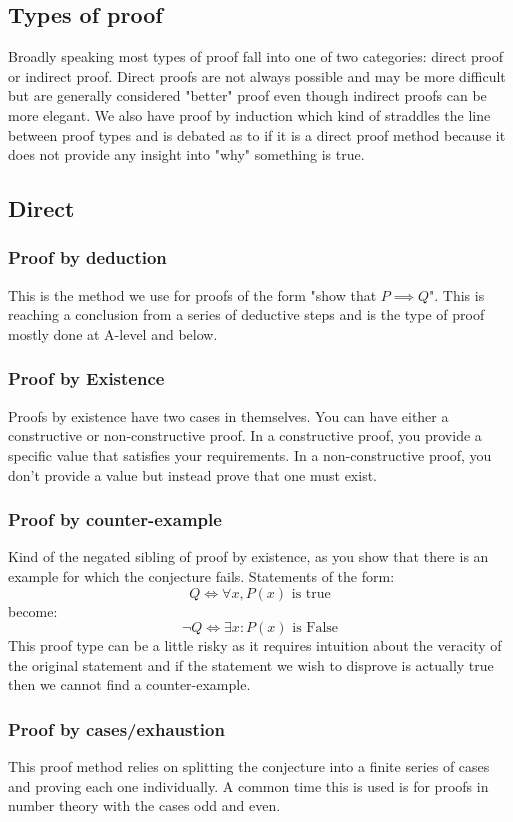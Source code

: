 \documentclass[12pt]{article}
\begin{document}
\subsection*{Types of proof}
Broadly speaking most types of proof fall into one of two categories: direct proof or indirect proof. Direct proofs are not always possible and may be more difficult but are generally considered "better" proof even though indirect proofs can be more elegant. We also have proof by induction which kind of straddles the line between proof types and is debated as to if it is a direct proof method because it does not provide any insight into "why" something is true.
\subsection*{Direct}
\subsubsection*{Proof by deduction}
This is the method we use for proofs of the form "show that \(P\implies Q\)". This is reaching a conclusion from a series of deductive steps and is the type of proof mostly done at A-level and below.
\subsubsection*{Proof by Existence}
Proofs by existence have two cases in themselves. You can have either a constructive or non-constructive proof. In a constructive proof, you provide a specific value that satisfies your requirements. In a non-constructive proof, you don't provide a value but instead prove that one must exist.
\subsubsection*{Proof by counter-example}
Kind of the negated sibling of proof by existence, as you show that there is an example for which the conjecture fails. Statements of the form:
\[Q\iff\forall x,P(x)\text{ is true}\]
become:
\[\lnot Q\iff\exists x: P(x) \text{ is False}\]
This proof type can be a little risky as it requires intuition about the veracity of the original statement and if the statement we wish to disprove is actually true then we cannot find a counter-example.
\subsubsection*{Proof by cases/exhaustion}
This proof method relies on splitting the conjecture into a finite series of cases and proving each one individually. A common time this is used is for proofs in number theory with the cases odd and even.
\end{document}
